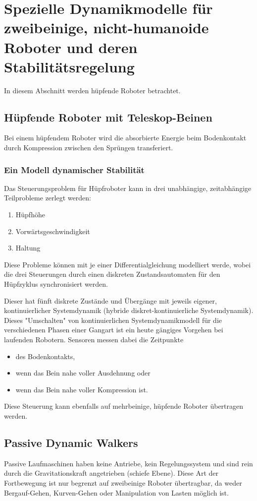 	\section{Spezielle Dynamikmodelle für zweibeinige, nicht-humanoide Roboter und deren Stabilitätsregelung}
		In diesem Abschnitt werden \zB hüpfende Roboter betrachtet.

		\subsection{Hüpfende Roboter mit Teleskop-Beinen}
			Bei einem hüpfendem Roboter wird die absorbierte Energie beim Bodenkontakt durch Kompression zwischen den Sprüngen transferiert.

			\subsubsection{Ein Modell dynamischer Stabilität}
				Das Steuerungsproblem für Hüpfroboter kann in drei unabhängige, zeitabhängige Teilprobleme zerlegt werden:
				\begin{enumerate}
					\item Hüpfhöhe
					\item Vorwärtsgeschwindigkeit
					\item Haltung
				\end{enumerate}
				Diese Probleme können mit je einer Differentialgleichung modelliert werde, wobei die drei Steuerungen durch einen diskreten Zustandsautomaten für den Hüpfzyklus synchronisiert werden.
				
				Dieser hat fünft diskrete Zustände und Übergänge mit jeweils eigener, kontinuierlicher Systemdynamik (hybride diskret-kontinuierliche Systemdynamik). Dieses "Umschalten" von kontinuierlichen Systemdynamikmodell für die verschiedenen Phasen einer Gangart ist ein heute gängiges Vorgehen bei laufenden Robotern. Sensoren messen dabei die Zeitpunkte
				\begin{itemize}
					\item des Bodenkontakts,
					\item wenn das Bein nahe voller Ausdehnung oder
					\item wenn das Bein nahe voller Kompression ist.
				\end{itemize}
				Diese Steuerung kann ebenfalls auf mehrbeinige, hüpfende Roboter übertragen werden.

		\subsection{Passive Dynamic Walkers}
			Passive Laufmaschinen haben keine Antriebe, kein Regelungssystem und sind rein durch die Gravitationskraft angetrieben (schiefe Ebene). Diese Art der Fortbewegung ist nur begrenzt auf zweibeinige Roboter übertragbar, da weder Bergauf-Gehen, Kurven-Gehen oder Manipulation von Lasten möglich ist.

